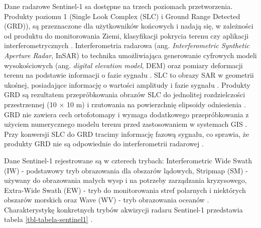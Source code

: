 \documentclass{amuthesis}
\begin{document}
Dane radarowe Sentinel-1 sa dostępne na trzech poziomach przetworzenia.
Produkty poziomu 1 (Single Look Complex (SLC) i Ground Range Detected
(GRD)), są przeznaczone dla użytkowników końcowych i nadają się, w
zależności od produktu do monitorowania Ziemi, klasyfikacji pokrycia
terenu czy aplikacji interferometrycznych
\autocite{hejmanowska_2020_dane}. Interferometria radarowa (ang.
\emph{Interferometric Synthetic Aperture Radar}, InSAR) to technika
umożliwiająca generowanie cyfrowych modeli wysokościowych (ang.
\emph{digital elevation model}, DEM) oraz pomiary deformacji terenu na
podstawie informacji o fazie sygnału
\autocite{hanssen_2001_insar,hejmanowska_2020_dane}. SLC to obrazy SAR w
geometrii ukośnej, posiadające informację o wartości amplitudy i fazie
sygnału \autocite{hejmanowska_2020_dane}. Produkty GRD są rezultatem
przepróbkowania obrazów SLC do jednolitej rozdzielczości przestrzennej
(10 × 10 m) i rzutowania na powierzchnię elipsoidy odniesienia
\autocite{hejmanowska_2020_dane}. GRD nie zawiera cech ortofotomapy i
wymaga dodatkowego przepróbkowania z użyciem numerycznego modelu terenu
przed zastosowaniem w systemach GIS \autocite{hejmanowska_2020_dane}.
Przy konwersji SLC do GRD tracimy informację fazową sygnału, co sprawia,
że produkty GRD nie są odpowiednie do interferometrii radarowej
\autocite{sentinel1_products}.

Dane Sentinel-1 rejestrowane są w czterech trybach: Interferometric Wide
Swath (IW) - podstawowy tryb obrazowania dla obszarów lądowych, Stripmap
(SM) - używany do obrazowania małych wysp i na potrzeby zarządzania
kryzysowego, Extra-Wide Swath (EW) - tryb do monitorowania stref
polarnych i niektórych obszarów morskich oraz Wave (WV) - tryb
obrazowania oceanów
\autocite{hejmanowska_2020_dane,sentinel1_instrument_payload,sentinel1_stripmap}.
Charakterystykę konkretnych trybów akwizycji radaru Sentinel-1
przedstawia tabela \ref{tbl-tabela-sentinel1}
\autocite{sentinel1_resolution_swath}.
\end{document}
